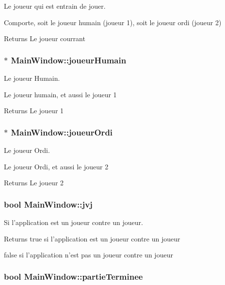 Le joueur qui est entrain de jouer. 

Comporte, soit le joueur humain (joueur 1), soit le joueur ordi (joueur 2) \begin{DoxyReturn}{Returns}
Le joueur courrant 
\end{DoxyReturn}
\hypertarget{class_main_window_ac8503f9eb4259016c7858e59aa31c1a4}{
\subsubsection[{joueur\-Humain}]{$\ast$ Main\-Window\-::joueur\-Humain}}\label{class_main_window_ac8503f9eb4259016c7858e59aa31c1a4}


Le joueur Humain. 

Le joueur humain, et aussi le joueur 1 \begin{DoxyReturn}{Returns}
Le joueur 1 
\end{DoxyReturn}
\hypertarget{class_main_window_acb5c1aad1ac317404027da04e4a175d3}{
\subsubsection[{joueur\-Ordi}]{$\ast$ Main\-Window\-::joueur\-Ordi}}\label{class_main_window_acb5c1aad1ac317404027da04e4a175d3}


Le joueur Ordi. 

Le joueur Ordi, et aussi le joueur 2 \begin{DoxyReturn}{Returns}
Le joueur 2 
\end{DoxyReturn}
\hypertarget{class_main_window_a8037ff2bca42ebb5858b0cebd5ef9bb7}{
\subsubsection[{jvj}]{\setlength{\rightskip}{0pt plus 5cm}bool Main\-Window\-::jvj}}\label{class_main_window_a8037ff2bca42ebb5858b0cebd5ef9bb7}


Si l'application est un joueur contre un joueur. 

\begin{DoxyReturn}{Returns}
true si l'application est un joueur contre un joueur 

false si l'application n'est pas un joueur contre un joueur 
\end{DoxyReturn}
\hypertarget{class_main_window_a00d26707b5d27cc6ce07479a46244692}{
\subsubsection[{partie\-Terminee}]{\setlength{\rightskip}{0pt plus 5cm}bool Main\-Window\-::partie\-Terminee}}\label{class_main_window_a00d26707b5d27cc6ce07479a46244692}


